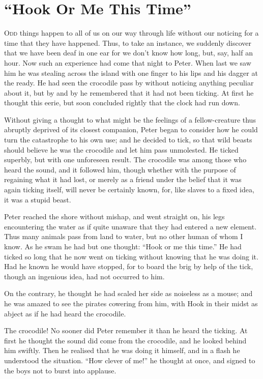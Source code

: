 \chapter{``Hook Or Me This Time''}

\lettrine{O}{dd} things happen to all of us on our way through life without our
noticing for a time that they have happened. Thus, to take an instance,
we suddenly discover that we have been deaf in one ear for we don't
know how long, but, say, half an hour. Now such an experience had come
that night to Peter. When last we saw him he was stealing across the
island with one finger to his lips and his dagger at the ready. He had
seen the crocodile pass by without noticing anything peculiar about it,
but by and by he remembered that it had not been ticking. At first he
thought this eerie, but soon concluded rightly that the clock had run
down.

Without giving a thought to what might be the feelings of a
fellow-creature thus abruptly deprived of its closest companion, Peter
began to consider how he could turn the catastrophe to his own use; and
he decided to tick, so that wild beasts should believe he was the
crocodile and let him pass unmolested. He ticked superbly, but with one
unforeseen result. The crocodile was among those who heard the sound,
and it followed him, though whether with the purpose of regaining what
it had lost, or merely as a friend under the belief that it was again
ticking itself, will never be certainly known, for, like slaves to a
fixed idea, it was a stupid beast.

Peter reached the shore without mishap, and went straight on, his legs
encountering the water as if quite unaware that they had entered a new
element. Thus many animals pass from land to water, but no other human
of whom I know. As he swam he had but one thought: ``Hook or me this
time.'' He had ticked so long that he now went on ticking without
knowing that he was doing it. Had he known he would have stopped, for
to board the brig by help of the tick, though an ingenious idea, had
not occurred to him.

On the contrary, he thought he had scaled her side as noiseless as a
mouse; and he was amazed to see the pirates cowering from him, with
Hook in their midst as abject as if he had heard the crocodile.

The crocodile! No sooner did Peter remember it than he heard the
ticking. At first he thought the sound did come from the crocodile, and
he looked behind him swiftly. Then he realised that he was doing it
himself, and in a flash he understood the situation. ``How clever of
me!'' he thought at once, and signed to the boys not to burst into
applause.

